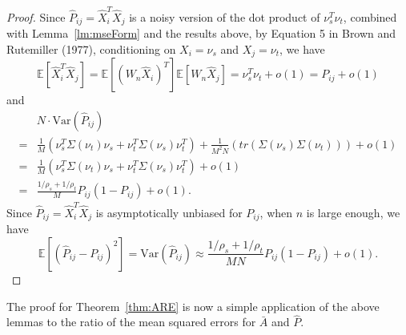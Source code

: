 \documentclass[10pt,letterpaper]{article}
\newtheorem{theorem}[fact]{Theorem}
\newcommand{\Ex}{\mathbb{E}}
\renewcommand{\hat}{\widehat}
\begin{document}
\begin{proof}
Since $\hat{P}_{ij} = \hat{X}_i^T \hat{X}_j$ is a noisy version of the dot product of $\nu_s^T \nu_t$, combined with Lemma~\ref{lm:mseForm} and the results above, by Equation 5 in Brown and Rutemiller (1977), conditioning on $X_i = \nu_s$ and $X_j = \nu_t$, we have
\[
	\Ex[\hat{X}_i^T \hat{X}_j] = \Ex[(W_n \hat{X}_i)^T] \Ex[W_n \hat{X}_j] = \nu_s^T \nu_t+o(1) = P_{ij}+o(1)
\]
and
\begin{align*}
	& N \cdot \mathrm{Var} (\hat{P}_{ij}) \\
    = & \frac{1}{M} \left( \nu_s^T \Sigma(\nu_t) \nu_s + \nu_t^T \Sigma(\nu_s) \nu_t^T \right)
    + \frac{1}{M^2 N} \left( tr(\Sigma(\nu_s) \Sigma(\nu_t)) \right) +o(1)\\
    = & \frac{1}{M} \left( \nu_s^T \Sigma(\nu_t) \nu_s + \nu_t^T \Sigma(\nu_s) \nu_t^T \right)+o(1) \\
    = & \frac{1/\rho_s + 1/\rho_t}{M} P_{ij}(1-P_{ij}) + o(1).
\end{align*}
Since $\hat{P}_{ij} = \hat{X}_i^T \hat{X}_j$ is asymptotically unbiased for $P_{ij}$, when $n$ is large enough, we have
\[
    \Ex[(\hat{P}_{ij} - P_{ij})^2] = \mathrm{Var}(\hat{P}_{ij}) \approx
    \frac{1/\rho_s + 1/\rho_t}{M N} P_{ij}(1-P_{ij})+o(1).
\]
\end{proof}






The proof for Theorem~\ref{thm:ARE} is now a simple application of the above lemmas to the ratio of the mean squared errors for $\bar{A}$ and $\hat{P}$.
\end{document}
